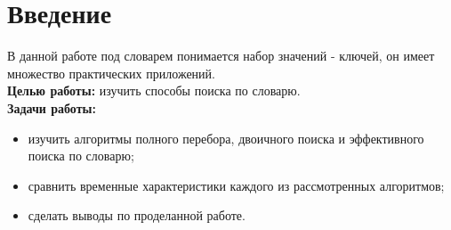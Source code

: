 \chapter*{Введение}


В данной работе под словарем понимается набор значений - ключей, он имеет множество практических приложений.
\\


\textbf{Целью работы:} изучить способы поиска по словарю.
\\

\textbf{Задачи работы:}

\begin{itemize}
    \setlength{\itemsep}{0em}
    \item изучить алгоритмы полного перебора, двоичного поиска и эффективного поиска по словарю;
    \item сравнить временные характеристики каждого из рассмотренных алгоритмов;
    \item сделать выводы по проделанной работе.
\end{itemize}
